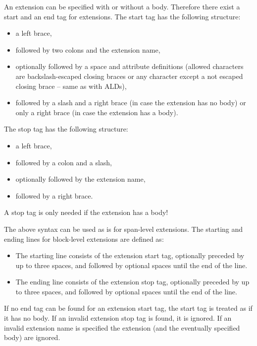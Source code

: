 \documentclass[a4paper]{article}
\begin{document}
An extension can be specified with or without a body. Therefore there
exist a start and an end tag for extensions. The start tag has the
following structure:

\begin{itemize}
\item
  a left brace,
\item
  followed by two colons and the extension name,
\item
  optionally followed by a space and attribute definitions (allowed
  characters are backslash-escaped closing braces or any character
  except a not escaped closing brace -- same as with ALDs),
\item
  followed by a slash and a right brace (in case the extension has no
  body) or only a right brace (in case the extension has a body).
\end{itemize}

The stop tag has the following structure:

\begin{itemize}
\item
  a left brace,
\item
  followed by a colon and a slash,
\item
  optionally followed by the extension name,
\item
  followed by a right brace.
\end{itemize}

A stop tag is only needed if the extension has a body!

The above syntax can be used as is for span-level extensions. The
starting and ending lines for block-level extensions are defined as:

\begin{itemize}
\item
  The starting line consists of the extension start tag, optionally
  preceded by up to three spaces, and followed by optional spaces until
  the end of the line.
\item
  The ending line consists of the extension stop tag, optionally
  preceded by up to three spaces, and followed by optional spaces until
  the end of the line.
\end{itemize}

If no end tag can be found for an extension start tag, the start tag is
treated as if it has no body. If an invalid extension stop tag is found,
it is ignored. If an invalid extension name is specified the extension
(and the eventually specified body) are ignored.
\end{document}
